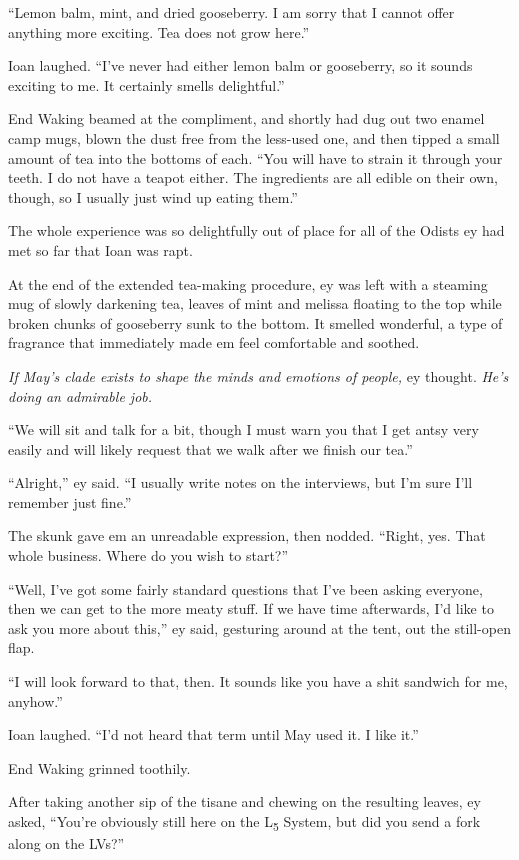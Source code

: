 ``Lemon balm, mint, and dried gooseberry. I am sorry that I cannot offer anything more exciting. Tea does not grow here.''

Ioan laughed. ``I've never had either lemon balm or gooseberry, so it sounds exciting to me. It certainly smells delightful.''

End Waking beamed at the compliment, and shortly had dug out two enamel camp mugs, blown the dust free from the less-used one, and then tipped a small amount of tea into the bottoms of each. ``You will have to strain it through your teeth. I do not have a teapot either. The ingredients are all edible on their own, though, so I usually just wind up eating them.''

The whole experience was so delightfully out of place for all of the Odists ey had met so far that Ioan was rapt.

At the end of the extended tea-making procedure, ey was left with a steaming mug of slowly darkening tea, leaves of mint and melissa floating to the top while broken chunks of gooseberry sunk to the bottom. It smelled wonderful, a type of fragrance that immediately made em feel comfortable and soothed.

\emph{If May's clade exists to shape the minds and emotions of people,} ey thought. \emph{He's doing an admirable job.}

``We will sit and talk for a bit, though I must warn you that I get antsy very easily and will likely request that we walk after we finish our tea.''

``Alright,'' ey said. ``I usually write notes on the interviews, but I'm sure I'll remember just fine.''

The skunk gave em an unreadable expression, then nodded. ``Right, yes. That whole business. Where do you wish to start?''

``Well, I've got some fairly standard questions that I've been asking everyone, then we can get to the more meaty stuff. If we have time afterwards, I'd like to ask you more about this,'' ey said, gesturing around at the tent, out the still-open flap.

``I will look forward to that, then. It sounds like you have a shit sandwich for me, anyhow.''

Ioan laughed. ``I'd not heard that term until May used it. I like it.''

End Waking grinned toothily.

After taking another sip of the tisane and chewing on the resulting leaves, ey asked, ``You're obviously still here on the L\textsubscript{5} System, but did you send a fork along on the LVs?''


